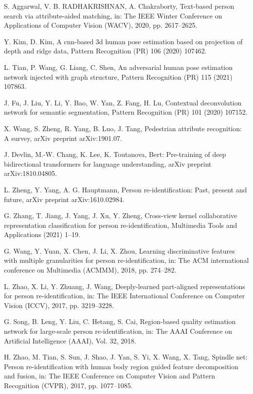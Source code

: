\documentclass[review]{elsarticle}
\begin{document}
\begin{thebibliography}{1}
S. Aggarwal, V. B. RADHAKRISHNAN, A. Chakraborty, Text-based person search via attribute-aided matching, in: The IEEE Winter Conference on Applications of Computer Vision (WACV), 2020, pp. 2617–2625.

Y. Kim, D. Kim, A cnn-based 3d human pose estimation based on projection of depth and ridge data, Pattern Recognition (PR) 106 (2020) 107462.

L. Tian, P. Wang, G. Liang, C. Shen, An adversarial human pose estimation network injected with graph structure, Pattern Recognition (PR) 115 (2021) 107863.

J. Fu, J. Liu, Y. Li, Y. Bao, W. Yan, Z. Fang, H. Lu, Contextual deconvolution network for semantic segmentation, Pattern Recognition (PR) 101 (2020) 107152.

X. Wang, S. Zheng, R. Yang, B. Luo, J. Tang, Pedestrian attribute recognition: A survey, arXiv preprint arXiv:1901.07.

J. Devlin, M.-W. Chang, K. Lee, K. Toutanova, Bert: Pre-training of deep bidirectional transformers for language understanding, arXiv preprint arXiv:1810.04805.

L. Zheng, Y. Yang, A. G. Hauptmann, Person re-identification: Past, present and future, arXiv preprint arXiv:1610.02984.

G. Zhang, T. Jiang, J. Yang, J. Xu, Y. Zheng, Cross-view kernel collaborative representation classification for person re-identification, Multimedia Tools and Applications (2021) 1–19.

G. Wang, Y. Yuan, X. Chen, J. Li, X. Zhou, Learning discriminative features with multiple granularities for person re-identification, in: The ACM international conference on Multimedia (ACMMM), 2018, pp. 274–282.

L. Zhao, X. Li, Y. Zhuang, J. Wang, Deeply-learned part-aligned representations for person re-identification, in: The IEEE International Conference on Computer Vision (ICCV), 2017, pp. 3219–3228.

G. Song, B. Leng, Y. Liu, C. Hetang, S. Cai, Region-based quality estimation network for large-scale person re-identification, in: The AAAI Conference on Artificial Intelligence (AAAI), Vol. 32, 2018.

H. Zhao, M. Tian, S. Sun, J. Shao, J. Yan, S. Yi, X. Wang, X. Tang, Spindle net: Person re-identification with human body region guided feature decomposition and fusion, in: The IEEE Conference on Computer Vision and Pattern Recognition (CVPR), 2017, pp. 1077–1085.


\end{thebibliography}
\end{document}
